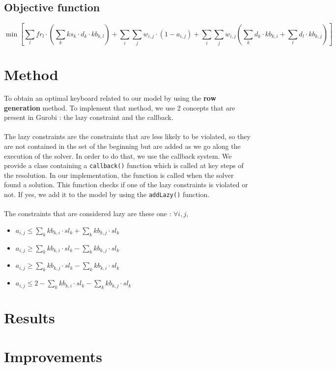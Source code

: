 \documentclass[a4paper,titlepage]{article}
\begin{document}
	\subsection{Objective function}

\[
	\min \left[ \sum_l fr_l \cdot \left( \sum_k ks_k \cdot d_k \cdot kb_{k,l}  \right) + \sum_i \sum_j w_{i,j} \cdot \left(1 - a_{i,j}\right) + \sum_i \sum_j w_{i,j} \left( \sum_k d_k \cdot kb_{k,i} + \sum_l d_l \cdot kb_{k,j} \right) \right]
\]



\section{Method}
To obtain an optimal keyboard related to our model by using the \textbf{row generation} method. To implement that method, we use 2 concepts that are present in Gurobi : the lazy constraint and the callback.
\paragraph{}
The lazy constraints are the constraints that are less likely to be violated, so they are not contained in the set of the beginning but are added as we go along the execution of the solver. In order to do that, we use the callback system. We provide a class containing a \texttt{callback()} function which is called at key steps of the resolution.
In our implementation, the function is called when the solver found a solution. This function checks if one of the lazy constraints is violated or not. If yes, we add it to the model by using the \texttt{addLazy()} function.
\paragraph{}
The constraints that are considered lazy are these one : $\forall i,j$,
\begin{itemize}
	\item $a_{i,j} \leq \sum_k kb_{k,i} \cdot sl_k + \sum_k kb_{k,j} \cdot sl_k$

	\item $a_{i,j} \geq \sum_k kb_{k,i} \cdot sl_k - \sum_k kb_{k,j} \cdot sl_k$

	\item $a_{i,j} \geq \sum_k kb_{k,j} \cdot sl_k - \sum_k kb_{k,i} \cdot sl_k$

	\item $a_{i,j} \leq 2 - \sum_k kb_{k,i} \cdot sl_k - \sum_k kb_{k,j} \cdot sl_k$
\end{itemize}
\paragraph{}



\section{Results}


\section{Improvements}

\newpage
\end{document}
